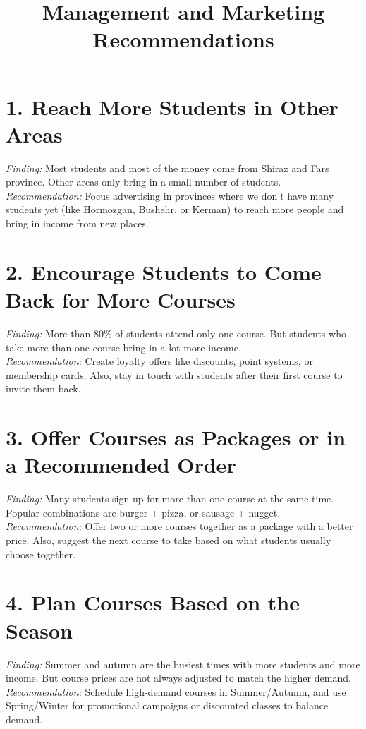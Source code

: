 \documentclass[12pt,a4paper]{article}
\title{Management and Marketing Recommendations}
\date{}
\begin{document}
\maketitle



\section*{1.  Reach More Students in Other Areas}
\textit{Finding:} Most students and most of the money come from Shiraz and Fars province. Other areas only bring in a small number of students. \\
\textit{Recommendation:} Focus advertising in provinces where we don’t have many students yet (like Hormozgan, Bushehr, or Kerman) to reach more people and bring in income from new places.

\section*{2. Encourage Students to Come Back for More Courses}
\textit{Finding:} More than 80\% of students attend only one course. But students who take more than one course bring in a lot more income. \\
\textit{Recommendation:} Create loyalty offers like discounts, point systems, or membership cards. Also, stay in touch with students after their first course to invite them back.

\section*{3. Offer Courses as Packages or in a Recommended Order}
\textit{Finding:} Many students sign up for more than one course at the same time. Popular combinations are burger + pizza, or sausage + nugget. \\
\textit{Recommendation:} Offer two or more courses together as a package with a better price. Also, suggest the next course to take based on what students usually choose together.

\section*{4. Plan Courses Based on the Season}
\textit{Finding:} Summer and autumn are the busiest times with more students and more income. But course prices are not always adjusted to match the higher demand. \\
\textit{Recommendation:} Schedule high-demand courses in Summer/Autumn, and use Spring/Winter for promotional campaigns or discounted classes to balance demand.
\end{document}

